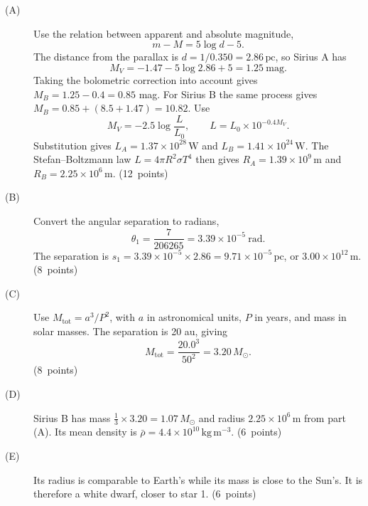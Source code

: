 \begin{description}
\item[(A)] Use the relation between apparent and absolute magnitude,
\[
m-M=5\log d-5.
\]
The distance from the parallax is $d=1/0.350=2.86\,\mathrm{pc}$, so Sirius A has
\[
M_V=-1.47-5\log2.86+5=1.25\ \mathrm{mag}.
\]
Taking the bolometric correction into account gives $M_B=1.25-0.4=0.85$ mag.
For Sirius B the same process gives $M_B=0.85+(8.5+1.47)=10.82$.
Use
\[
M_V=-2.5\log\frac{L}{L_0},\qquad L=L_0\times10^{-0.4M_V}.
\]
Substitution gives $L_A=1.37\times10^{28}\,\mathrm{W}$ and $L_B=1.41\times10^{24}\,\mathrm{W}$.
The Stefan--Boltzmann law $L=4\pi R^2\sigma T^4$ then gives
$R_A=1.39\times10^9\,\mathrm{m}$ and $R_B=2.25\times10^6\,\mathrm{m}$. \hfill\mbox{(12 points)}
\item[(B)] Convert the angular separation to radians,
\[
\theta_1=\frac{7}{206265}=3.39\times10^{-5}\ \mathrm{rad}.
\]
The separation is $s_1=3.39\times10^{-5}\times2.86=9.71\times10^{-5}\,\mathrm{pc}$,
or $3.00\times10^{12}\,\mathrm{m}$. \hfill\mbox{(8 points)}
\item[(C)] Use $M_{\mathrm{tot}}=a^3/P^2$, with $a$ in astronomical units, $P$ in years,
and mass in solar masses. The separation is 20 au, giving
\[
M_{\mathrm{tot}}=\frac{20.0^3}{50^2}=3.20\,M_\odot.
\]
\hfill\mbox{(8 points)}
\item[(D)] Sirius B has mass $\tfrac13\times3.20=1.07\,M_\odot$ and radius
$2.25\times10^6\,\mathrm{m}$ from part (A). Its mean density is
$\bar\rho=4.4\times10^{10}\,\mathrm{kg\,m^{-3}}$. \hfill\mbox{(6 points)}
\item[(E)] Its radius is comparable to Earth's while its mass is close to the Sun's.
It is therefore a white dwarf, closer to star 1. \hfill\mbox{(6 points)}
\end{description}
